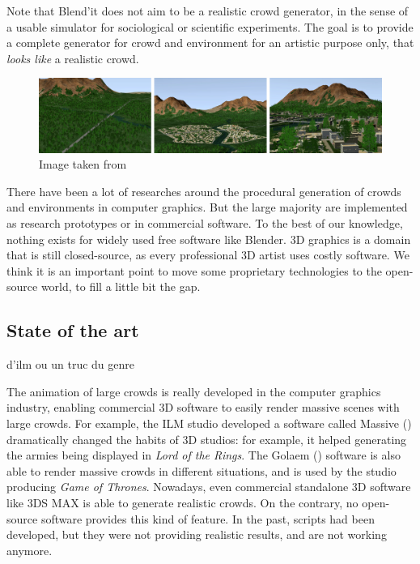 Note that Blend'it does not aim to be a realistic crowd generator, in
the sense of a usable simulator for sociological or scientific
experiments. The goal is to provide a complete generator for crowd and
environment for an artistic purpose only, that \textit{looks like} a
realistic crowd.

\begin{figure}[h]
  \includegraphics[width=15cm]{img/env1.jpg}
  \caption{Image taken from \cite{DeclarativeArchitecture}}
  \label{fig:env}
\end{figure}


There have been a lot of researches around the procedural generation
of crowds and environments in computer graphics. But the large
majority are implemented as research prototypes or in commercial
software. To the best of our knowledge, nothing exists for widely used
free software like Blender. 3D graphics is a domain that is still
closed-source, as every professional 3D artist uses costly
software. We think it is an important point to move some proprietary
technologies to the open-source world, to fill a little bit the gap.

\subsection{State of the art}

d'ilm ou un truc du genre

The animation of large crowds is really developed in the computer
graphics industry, enabling commercial 3D software to easily render
massive scenes with large crowds. For example, the ILM studio
developed a software called Massive (\cite{Massive}) dramatically
changed the habits of 3D studios: for example, it helped generating
the armies being displayed in \textit{Lord of the Rings}. The Golaem
(\cite{Golaem}) software is also able to render massive crowds in
different situations, and is used by the studio producing \textit{Game
of Thrones}. Nowadays, even commercial standalone 3D software like 3DS
MAX\cite{3dsmax} is able to generate realistic crowds. On the
contrary, no open-source software provides this kind of feature. In
the past, scripts had been developed, but they were not providing
realistic results, and are not working anymore.


